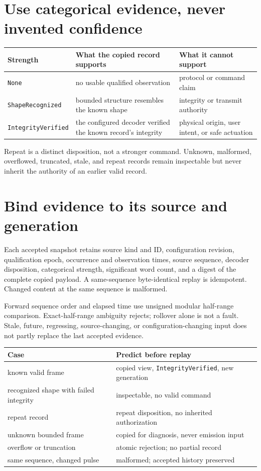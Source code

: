 \documentclass[10pt]{article}
\begin{document}
\section{Use categorical evidence, never invented confidence}
\begin{tabularx}{\linewidth}{@{}l X X@{}}
\toprule
Strength & What the copied record supports & What it cannot support\\
\midrule
\texttt{None} & no usable qualified observation & protocol or command claim\\
\texttt{ShapeRecognized} & bounded structure resembles the known shape &
integrity or transmit authority\\
\texttt{IntegrityVerified} & the configured decoder verified the known
record's integrity & physical origin, user intent, or safe actuation\\
\bottomrule
\end{tabularx}

Repeat is a distinct disposition, not a stronger command. Unknown, malformed,
overflowed, truncated, stale, and repeat records remain inspectable but never
inherit the authority of an earlier valid record.

\section{Bind evidence to its source and generation}
Each accepted snapshot retains source kind and ID, configuration revision,
qualification epoch, occurrence and observation times, source sequence,
decoder disposition, categorical strength, significant word count, and a
digest of the complete copied payload. A same-sequence byte-identical replay
is idempotent. Changed content at the same sequence is malformed.

Forward sequence order and elapsed time use unsigned modular half-range
comparison. Exact-half-range ambiguity rejects; rollover alone is not a
fault. Stale, future, regressing, source-changing, or configuration-changing
input does not partly replace the last accepted evidence.

\begin{tabularx}{\linewidth}{@{}l X@{}}
\toprule
Case & Predict before replay\\
\midrule
known valid frame & copied view, \texttt{IntegrityVerified}, new generation\\
recognized shape with failed integrity & inspectable, no valid command\\
repeat record & repeat disposition, no inherited authorization\\
unknown bounded frame & copied for diagnosis, never emission input\\
overflow or truncation & atomic rejection; no partial record\\
same sequence, changed pulse & malformed; accepted history preserved\\
\bottomrule
\end{tabularx}
\end{document}
